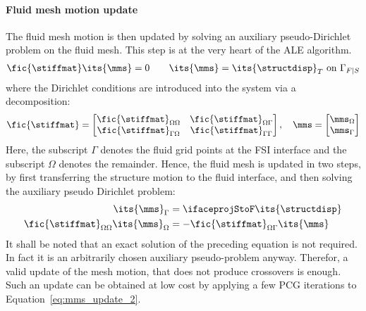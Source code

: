 \documentclass[../main.tex]{subfiles}
\begin{document}
\paragraph{\raisebox{.5pt}{\textcircled{\raisebox{-.9pt} {3}}} Fluid mesh motion update}
The fluid mesh motion is then updated by solving an auxiliary pseudo-Dirichlet problem on the fluid mesh. This step is at the very heart of the \ac{ALE} algorithm.
\begin{align}
\fic{\stiffmat} \its{\mms} = 0~~~\text{}~~~\its{\mms}=\its{\structdisp}_T~\text{on}~\Gamma_{F|S}
\end{align}
where the Dirichlet conditions are introduced into the system via a decomposition:
\begin{align}
\fic{\stiffmat}=
\begin{bmatrix}
\fic{\stiffmat}_{\Omega\Omega}   &  \fic{\stiffmat}_{\Omega\Gamma}   \\
\fic{\stiffmat}_{\Gamma\Omega}   &  \fic{\stiffmat}_{\Gamma\Gamma}   \\
\end{bmatrix},~~~
\mms=
\begin{bmatrix}
\mms_{\Omega} \\
\mms_{\Gamma} \\
\end{bmatrix}
\end{align}
Here, the subscript $\Gamma$ denotes the fluid grid points at the FSI interface and the subscript $\Omega$ denotes the remainder. Hence, the fluid mesh is updated in two steps, by first transferring the structure motion to the fluid interface, and then solving the auxiliary pseudo Dirichlet problem:
\begin{align}
\its{\mms}_{\Gamma}&=\ifaceprojStoF \its{\structdisp}\label{eq:mms_update_1}\\
\fic{\stiffmat}_{\Omega\Omega} \its{\mms}_\Omega &= -\fic{\stiffmat}_{\Omega\Gamma} \its{\mms} \label{eq:mms_update_2}
\end{align}
It shall be noted that an exact solution of the preceding equation is not required. In fact it is an arbitrarily chosen auxiliary pseudo-problem anyway. Therefor, a valid update of the mesh motion, that does not produce crossovers is enough. Such an update can be obtained at low cost by applying a few \ac{PCG} iterations to Equation~\eqref{eq:mms_update_2}.
\end{document}
